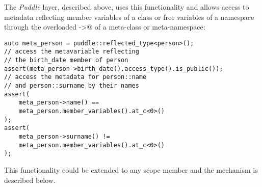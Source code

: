 The {\em Puddle} layer, described above, uses this functionality and allows
access to metadata reflecting member variables of a class or free variables
of a namespace through the overloaded \verb@operator ->@ of a meta-class
or meta-namespace:

\begin{verbatim}
auto meta_person = puddle::reflected_type<person>();
// access the metavariable reflecting
// the birth_date member of person
assert(meta_person->birth_date().access_type().is_public());
// access the metadata for person::name
// and person::surname by their names
assert(
	meta_person->name() ==
	meta_person.member_variables().at_c<0>()
);
assert(
	meta_person->surname() !=
	meta_person.member_variables().at_c<0>()
);

\end{verbatim}

This functionality could be extended to any scope member and
the mechanism is described below.

